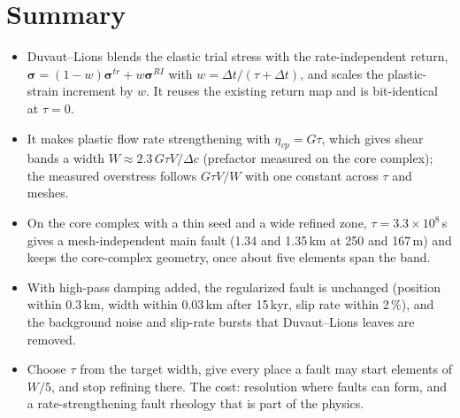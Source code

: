 \documentclass[11pt]{article}
\newcommand{\sig}{\boldsymbol\sigma}
\begin{document}
\section{Summary}
\begin{itemize}
\item Duvaut--Lions blends the elastic trial stress with the rate-independent return,
  $\sig=(1-w)\sig^{tr}+w\sig^{RI}$ with $w=\Delta t/(\tau+\Delta t)$, and scales the plastic-strain
  increment by $w$. It reuses the existing return map and is bit-identical at $\tau=0$.
\item It makes plastic flow rate strengthening with $\eta_{vp}=G\tau$, which gives shear bands a width
  $W\approx2.3\,G\tau V/\Delta c$ (prefactor measured on the core complex); the measured overstress follows $G\tau V/W$ with one constant across
  $\tau$ and meshes.
\item On the core complex with a thin seed and a wide refined zone, $\tau=3.3\times10^8$\,s gives a
  mesh-independent main fault (1.34 and 1.35\,km at 250 and 167\,m) and keeps the core-complex
  geometry, once about five elements span the band.
\item With high-pass damping added, the regularized fault is unchanged (position within 0.3\,km,
  width within 0.03\,km after 15\,kyr, slip rate within 2\,\%), and the background noise and slip-rate
  bursts that Duvaut--Lions leaves are removed.
\item Choose $\tau$ from the target width, give every place a fault may start elements of $W/5$, and
  stop refining there. The cost: resolution where faults can form, and a rate-strengthening fault
  rheology that is part of the physics.
\end{itemize}
\end{document}
